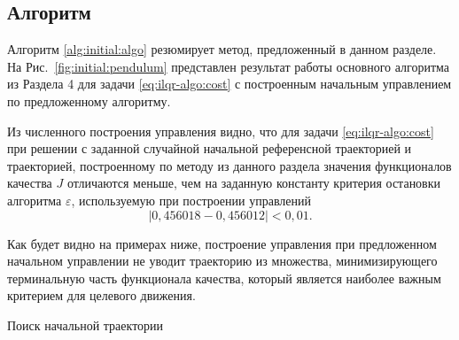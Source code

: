 \documentclass[../../doc.tex]{subfiles}
\begin{document}
    \subsection{Алгоритм}

    Алгоритм \ref{alg:initial:algo} резюмирует метод, предложенный в данном разделе.
    На Рис.~\ref{fig:initial:pendulum} представлен результат работы основного алгоритма из Раздела 4 для задачи \eqref{eq:ilqr-algo:cost} с построенным начальным управлением по предложенному алгоритму.

    \begin{remark}
        Из численного построения управления видно,
        что для задачи \eqref{eq:ilqr-algo:cost}
        при решении с заданной случайной начальной референсной траекторией и траекторией, построенному по методу из данного раздела
        значения функционалов качества $J$ отличаются меньше, чем на заданную константу критерия остановки алгоритма $\varepsilon$, используемую
        при построении управлений
        $$
            | 0,\!456018 - 0,\!456012 | < 0,\!01. 
        $$
    \end{remark}

    Как будет видно на примерах ниже, построение управления при предложенном начальном управлении
    не уводит траекторию из множества, минимизирующего терминальную часть функционала качества,
    который является наиболее важным критерием для целевого движения.
    
    \begin{rusalgorithm}\caption{Поиск начальной траектории}\label{alg:initial:algo}
        \DontPrintSemicolon
        
    \end{rusalgorithm}
\end{document}
